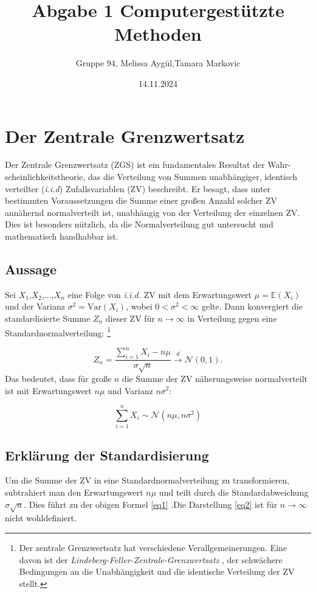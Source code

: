 \documentclass{article}
\title{Abgabe 1 Computergestützte Methoden}
\author{Gruppe 94, Melissa Aygül,Tamara Markovic}
\date{14.11.2024}
\begin{document}
\maketitle
\tableofcontents

\newpage

\section{Der Zentrale Grenzwertsatz}
Der Zentrale Grenzwertsatz (ZGS) ist ein fundamentales Resultat der Wahr-
scheinlichkeitstheorie, das die Verteilung von Summen unabhängiger, identisch verteilter (\textit{i.i.d}) Zufallsvariablen (ZV) beschreibt. Er besagt, dass unter bestimmten Voraussetzungen die Summe einer großen Anzahl solcher ZV annähernd normalverteilt ist, unabhängig von der Verteilung der einzelnen ZV. Dies ist besonders nützlich, da die Normalverteilung gut untersucht und mathematisch handhabbar ist.

\subsection{Aussage}
Sei $X_1$,$X_2$,...,$X_n$ eine Folge von \textit{i.i.d.} ZV mit dem Erwartungswert $\mu = \mathbb{E}(X_i)$ und der Varianz $\sigma^2 = \text{Var}(X_i)$, wobei $0 < \sigma^2 < \infty$ gelte. Dann konvergiert
die standardisierte Summe $Z_n$ dieser ZV für $n \to \infty$
in Verteilung gegen eine Standardnormalverteilung:
\footnote{Der zentrale Grenzwertsatz hat verschiedene Verallgemeinerungen. Eine davon ist der 
\textit{Lindeberg-Feller-Zentrale-Grenzwertsatz} \cite[Seite 328]{Klenke}, der schwächere Bedingungen an die Unabhängigkeit 
und die identische Verteilung der ZV stellt.}

\begin{equation}
Z_n = \frac{\sum_{i=1}^n X_i - n\mu}{\sigma\sqrt{n}} \overset{d}{\to} \mathcal{N}(0, 1).
\label{eq1}
\end{equation}
Das bedeutet, dass für große $n$ die Summe der ZV näherungsweise normalverteilt ist 
mit Erwartungswert $n\mu$ und Varianz $n\sigma^2$:

\begin{equation}
\sum_{i=1}^n X_i \sim \mathcal{N}(n\mu, n\sigma^2)
\label{eq2}
\end{equation}

\subsection{Erklärung der Standardisierung}
Um die Summe der ZV in eine Standardnormalverteilung zu transformieren, subtrahiert man den Erwartungswert $n\mu$ und teilt durch die Standardabweichung $\sigma\sqrt{n}$. Dies führt zu der obigen Formel \eqref{eq1} .Die Darstellung \eqref{eq2} ist für
$n \to \infty$ nicht wohldefiniert.
\end{document}
